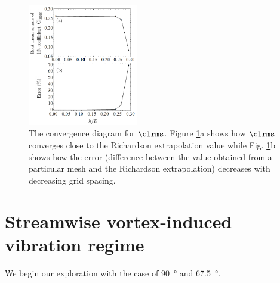\documentclass[a4paper,fleqn]{cas-sc}
\begin{document}
\begin{figure}
  \centering
  \includegraphics[width=0.43\textwidth]{figs/figure9}
  \caption{The convergence diagram for $\clrms$. Figure \ref{fig:clrmsGCI}a shows how $\clrms$ converges close to the Richardson extrapolation value while Fig. \ref{fig:clrmsGCI}b shows how the error (difference between the value obtained from a particular mesh and the Richardson extrapolation) decreases with decreasing grid spacing.} \label{fig:clrmsGCI}
\end{figure}

\section{Streamwise vortex-induced vibration regime}\label{sec:svivRegime}
We begin our exploration with the case of \SI{90}{\degree} and \SI{67.5}{\degree}.
\end{document}
